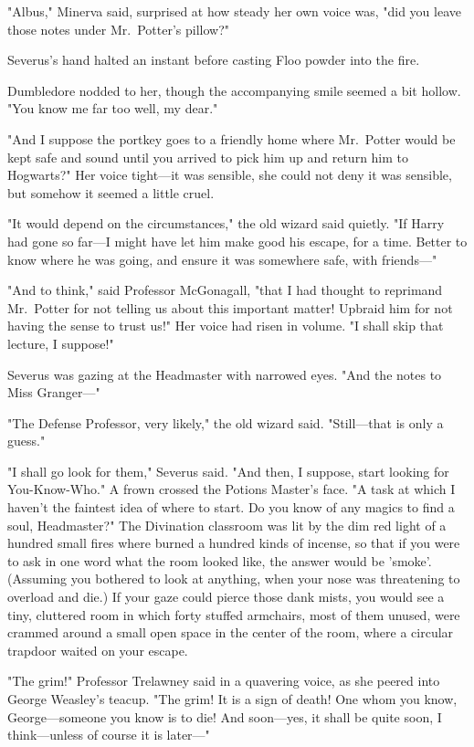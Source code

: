 "Albus," Minerva said, surprised at how steady her own voice was, "did you 
leave those notes under Mr.~Potter's pillow?"

Severus's hand halted an instant before casting Floo powder into the fire.

Dumbledore nodded to her, though the accompanying smile seemed a bit hollow. 
"You know me far too well, my dear."

"And I suppose the portkey goes to a friendly home where Mr.~Potter would be 
kept safe and sound until you arrived to pick him up and return him to 
Hogwarts?" Her voice tight---it was sensible, she could not deny it was 
sensible, but somehow it seemed a little cruel.

"It would depend on the circumstances," the old wizard said quietly. "If Harry 
had gone so far---I might have let him make good his escape, for a time. Better 
to know where he was going, and ensure it was somewhere safe, with friends---"

"And to think," said Professor McGonagall, "that I had thought to reprimand 
Mr.~Potter for not telling us about this important matter! Upbraid him for not 
having the sense to trust us!" Her voice had risen in volume. "I shall skip 
that lecture, I suppose!"

Severus was gazing at the Headmaster with narrowed eyes. "And the notes to Miss 
Granger---"

"The Defense Professor, very likely," the old wizard said. "Still---that is 
only a guess."

"I shall go look for them," Severus said. "And then, I suppose, start looking 
for You-Know-Who." A frown crossed the Potions Master's face. "A task at which 
I haven't the faintest idea of where to start. Do you know of any magics to 
find a soul, Headmaster?"
\sbreak
The Divination classroom was lit by the dim red light of a hundred small fires 
where burned a hundred kinds of incense, so that if you were to ask in one word 
what the room looked like, the answer would be 'smoke'. (Assuming you bothered 
to look at anything, when your nose was threatening to overload and die.) If 
your gaze could pierce those dank mists, you would see a tiny, cluttered room 
in which forty stuffed armchairs, most of them unused, were crammed around a 
small open space in the center of the room, where a circular trapdoor waited on 
your escape.

"The grim!" Professor Trelawney said in a quavering voice, as she peered into 
George Weasley's teacup. "The grim! It is a sign of death! One whom you know, 
George---someone you know is to die! And soon---yes, it shall be quite soon, I 
think---unless of course it is later---"

